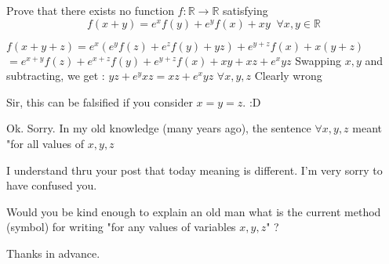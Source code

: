 \begin{solution}
	\begin{tcolorbox}Prove that there exists no function $f: \mathbb{R} \to \mathbb{R}$ satisfying
$$f(x+y)=e^xf(y)+e^yf(x)+xy \;\; \forall x,y\in  \mathbb{R}$$\end{tcolorbox}
$f(x+y+z)=e^x(e^yf(z)+e^zf(y)+yz)+e^{y+z}f(x)+x(y+z)$
$=e^{x+y}f(z)+e^{x+z}f(y)+e^{y+z}f(x)+xy+xz+e^xyz$
Swapping $x,y$ and subtracting, we  get : $yz+e^yxz=xz+e^xyz$ $\forall x,y,z$
Clearly wrong


\end{solution}






\begin{solution}
	\begin{tcolorbox}Sir, this can be falsified if you consider $x=y=z$. :D\end{tcolorbox}
Ok. Sorry.
In my old knowledge (many years ago), the sentence $\forall x,y,z$ meant "for all values of $x,y,z$

I understand thru your post that today meaning is different.
I'm very sorry to have confused you.

Would you be kind enough to explain an old man what is the current method (symbol) for writing "for any values of variables $x,y,z$" ?

Thanks in advance.


\end{solution}



